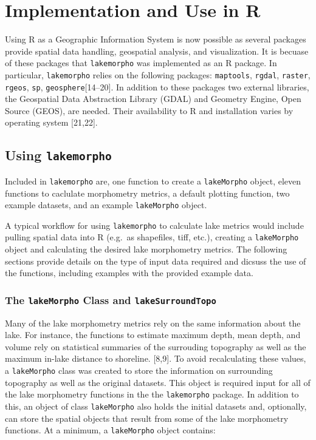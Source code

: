 \documentclass[11pt,]{article}
\begin{document}
\section{Implementation and Use in R}\label{implementation-and-use-in-r}

Using R as a Geographic Information System is now possible as several
packages provide spatial data handling, geospatial analysis, and
visualization. It is becuase of these packages that \texttt{lakemorpho}
was implemented as an R package. In particular, \texttt{lakemorpho}
relies on the following packages: \texttt{maptools}, \texttt{rgdal},
\texttt{raster}, \texttt{rgeos}, \texttt{sp},
\texttt{geosphere}{[}14--20{]}. In addition to these packages two
external libraries, the Geospatial Data Abstraction Library (GDAL) and
Geometry Engine, Open Source (GEOS), are needed. Their availability to R
and installation varies by operating system {[}21,22{]}.

\subsection{\texorpdfstring{Using
\texttt{lakemorpho}}{Using lakemorpho}}\label{using-lakemorpho}

Included in \texttt{lakemorpho} are, one function to create a
\texttt{lakeMorpho} object, eleven functions to caclulate morphometry
metrics, a default plotting function, two example datasets, and an
example \texttt{lakeMorpho} object.

A typical workflow for using \texttt{lakemorpho} to calculate lake
metrics would include pulling spatial data into R (e.g.~as shapefiles,
tiff, etc.), creating a \texttt{lakeMorpho} object and calculating the
desired lake morphometry metrics. The following sections provide details
on the type of input data required and dicsuss the use of the functions,
including examples with the provided example data.

\subsubsection{\texorpdfstring{The \texttt{lakeMorpho} Class and
\texttt{lakeSurroundTopo}}{The lakeMorpho Class and lakeSurroundTopo}}\label{the-lakemorpho-class-and-lakesurroundtopo}

Many of the lake morphometry metrics rely on the same information about
the lake. For instance, the functions to estimate maximum depth, mean
depth, and volume rely on statistical summaries of the surrouding
topography as well as the maximum in-lake distance to shoreline.
{[}8,9{]}. To avoid recalculating these values, a \texttt{lakeMorpho}
class was created to store the information on surrounding topography as
well as the original datasets. This object is required input for all of
the lake morphometry functions in the the \texttt{lakemorpho} package.
In addition to this, an object of class \texttt{lakeMorpho} also holds
the initial datasets and, optionally, can store the spatial objects that
result from some of the lake morphometry functions. At a minimum, a
\texttt{lakeMorpho} object contains:
\end{document}
